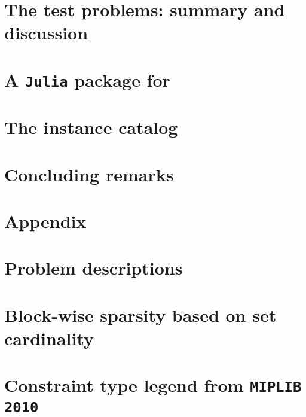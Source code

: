 	\section{The test problems: summary and discussion}\label{sec:summary}
	
	
	\section{A \texttt{Julia} package for \siplibtwo} \label{sec:package}
	
	
	\section{The instance catalog}\label{sec:instance_catalog}
	
	
	\section{Concluding remarks}\label{sec:conclusion}
	
	
	
	\appendix
	
	\section*{Appendix}
	
	\section{Problem descriptions} \label{sec:prob_desc}
	
	
	\section{Block-wise sparsity based on set cardinality} \label{sec:sparsity}
	
	
	\section{Constraint type legend from \texttt{MIPLIB 2010}} \label{sec:miplibconstraint}
	
	
